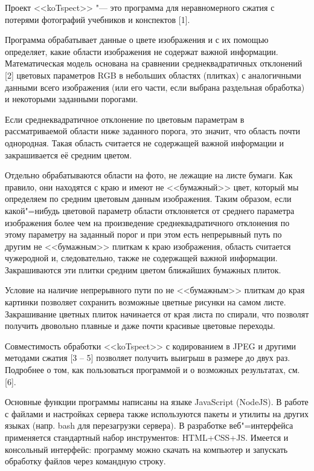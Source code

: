 



\vzmscaption

Проект <<{koTspect}>> "--- это программа для неравномерного сжатия с потерями фотографий учебников и конспектов [1].

Программа обрабатывает данные о цвете изображения и с их помощью определяет, какие области изображения
не содержат важной информации. Математическая модель основана на сравнении среднеквадратичных отклонений [2]
цветовых параметров {RGB} в небольших областях (плитках) с аналогичными данными всего изображения (или его части, если выбрана
раздельная обработка) и некоторыми заданными порогами.

Если среднеквадратичное отклонение по цветовым параметрам в рассматриваемой области ниже заданного порога,
это значит, что область почти однородная. Такая область считается не содержащей важной информации и закрашивается её
средним цветом.

Отдельно обрабатываются области на фото, не лежащие на листе бумаги. Как правило, они находятся с краю и имеют
не <<бумажный>> цвет, который мы определяем по средним цветовым данным изображения. Таким образом, если какой"=нибудь
цветовой параметр области отклоняется от среднего параметра изображения более чем на произведение среднеквадратичного
отклонения по этому параметру на заданный порог и при этом есть непрерывный путь по другим не <<бумажным>> плиткам к
краю изображения, область считается чужеродной и, следовательно, также не содержащей важной информации. Закрашиваются
эти плитки средним цветом ближайших бумажных плиток.

Условие на наличие непрерывного пути по не <<бумажным>> плиткам до края картинки позволяет сохранить возможные цветные
рисунки на самом листе. Закрашивание цветных плиток начинается от края листа по спирали, что позволят получить
двовольно плавные и даже почти красивые цветовые переходы.

Совместимость обработки <<{koTspect}>> с кодированием в {JPEG} и другими методами сжатия [3 -- 5] позволяет получить выигрыш в размере
до двух раз. Подробнее о том, как пользоваться программой и о возможных результатах, см. [6].

Основные функции программы написаны на языке \foreignlanguage{english}{JavaScript (NodeJS)}. В работе с файлами и настройках сервера также используются
пакеты и утилиты на других языках (напр. \foreignlanguage{english}{bash} для перезагрузки сервера). В разработке веб"=интерфейса применяется стандартный
набор инструментов: \foreignlanguage{english}{HTML+CSS+JS}.
Имеется и консольный интерфейс: программу можно скачать на компьютер и запускать обработку файлов через командную строку.

